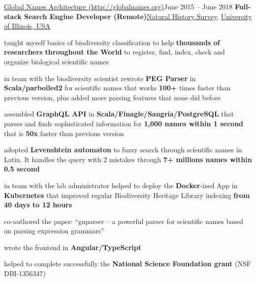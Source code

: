 \documentclass{resume} %
\begin{document}
\begin{samepage}
\begin{rSubsection}{\href{http://globalnames.org/}{Global Names Architecture
(http://globalnames.org)}}{June 2015 -- June 2018}
{\textbf{Full-stack Search Engine Developer (Remote)}}{\href{http://www.inhs.illinois.edu/}{Natural History Survey},
\href{http://illinois.edu/}{University of Illinois, USA}}
\item taught myself basics of biodiversity classification to help \textbf{thousands of researchers throughout the World} to register, find, index, check and organize
biological scientific names
\item in team with the biodiversity scientist rewrote \textbf{PEG Parser} in \textbf{Scala/parboiled2} for scientific names that works \textbf{100+} times faster than previous version, plus added more parsing features that none did before
\item assembled \textbf{GraphQL API} in \textbf{Scala/Finagle/Sangria/PostgreSQL} that parses and
finds sophisticated information for \textbf{1,000 names within 1 second} that is \textbf{50x} faster
than previous version
\item adopted \textbf{Levenshtein automaton} to fuzzy search through scientific names in Latin.
It handles the query with 2 mistakes through \textbf{7+ millions names within 0.5 second}
\item in team with the lab administrator helped to deploy the \textbf{Docker}-ized App in \textbf{Kubernetes} that improved regular Biodiversity Heritage Library indexing \textbf{from 40 days to 12 hours}
\item co-authored the paper: ``gnparser -- a powerful parser for scientific names based on parsing expression
grammars''
\item wrote the frontend in \textbf{Angular/TypeScript}
\item helped to complete successfully the \textbf{National Science Foundation grant} (NSF DBI-1356347)
\end{rSubsection}
\end{samepage}

\end{document}
